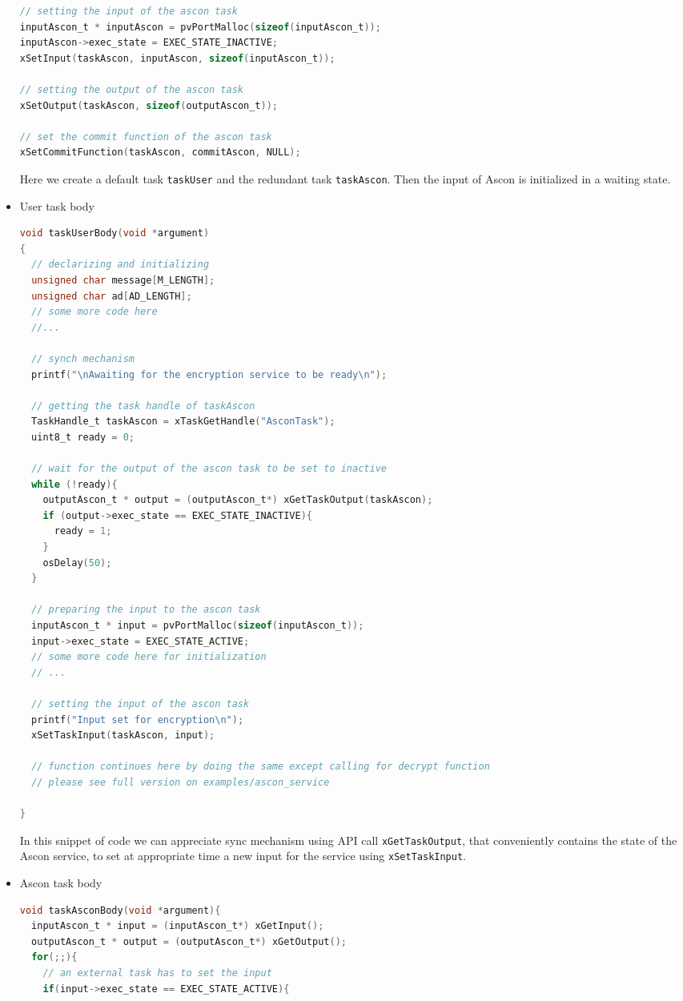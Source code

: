 \documentclass[a4paper, 12pt]{article}
\begin{document}
\begin{onehalfspace}
\begin{itemize}
{\begin{lstlisting}[language=C]
// setting the input of the ascon task
inputAscon_t * inputAscon = pvPortMalloc(sizeof(inputAscon_t));
inputAscon->exec_state = EXEC_STATE_INACTIVE;
xSetInput(taskAscon, inputAscon, sizeof(inputAscon_t));

// setting the output of the ascon task
xSetOutput(taskAscon, sizeof(outputAscon_t));

// set the commit function of the ascon task
xSetCommitFunction(taskAscon, commitAscon, NULL);
    \end{lstlisting}
    Here we create a default task \texttt{taskUser} and the redundant task \texttt{taskAscon}. Then the input of Ascon is initialized in a waiting state.
    }
    \newpage
    \item {
    User task body
    \begin{lstlisting}[language=C]
void taskUserBody(void *argument)
{
  // declarizing and initializing
  unsigned char message[M_LENGTH];
  unsigned char ad[AD_LENGTH];
  // some more code here
  //...

  // synch mechanism
  printf("\nAwaiting for the encryption service to be ready\n");

  // getting the task handle of taskAscon
  TaskHandle_t taskAscon = xTaskGetHandle("AsconTask");
  uint8_t ready = 0;
  
  // wait for the output of the ascon task to be set to inactive
  while (!ready){
    outputAscon_t * output = (outputAscon_t*) xGetTaskOutput(taskAscon);
    if (output->exec_state == EXEC_STATE_INACTIVE){
      ready = 1;
    }
    osDelay(50);
  }

  // preparing the input to the ascon task
  inputAscon_t * input = pvPortMalloc(sizeof(inputAscon_t));
  input->exec_state = EXEC_STATE_ACTIVE;
  // some more code here for initialization
  // ...

  // setting the input of the ascon task
  printf("Input set for encryption\n");
  xSetTaskInput(taskAscon, input);

  // function continues here by doing the same except calling for decrypt function
  // please see full version on examples/ascon_service

}
    \end{lstlisting}
    In this snippet of code we can appreciate sync mechanism using API call \texttt{xGetTaskOutput}, that conveniently contains the state of the Ascon service, to set at appropriate time a new input for the service using \texttt{xSetTaskInput}.
    }
    \item {
    Ascon task body
    \begin{lstlisting}[language=C]
void taskAsconBody(void *argument){
  inputAscon_t * input = (inputAscon_t*) xGetInput();
  outputAscon_t * output = (outputAscon_t*) xGetOutput();
  for(;;){
    // an external task has to set the input
    if(input->exec_state == EXEC_STATE_ACTIVE){


\end{lstlisting}}
\end{itemize}
\end{onehalfspace}
\end{document}
